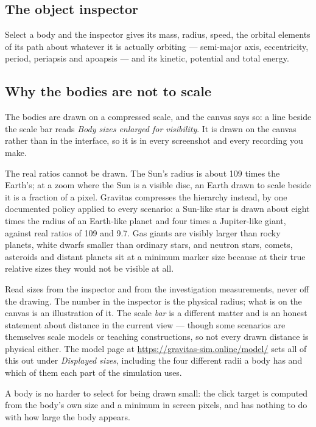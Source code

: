 \documentclass[11pt,a4paper]{article}
\begin{document}
\subsection{The object inspector}

Select a body and the inspector gives its mass, radius, speed, the orbital
elements of its path about whatever it is actually orbiting --- semi-major axis,
eccentricity, period, periapsis and apoapsis --- and its kinetic, potential and
total energy.

\subsection{Why the bodies are not to scale}

The bodies are drawn on a compressed scale, and the canvas says so: a line
beside the scale bar reads \emph{Body sizes enlarged for visibility}. It is
drawn on the canvas rather than in the interface, so it is in every screenshot
and every recording you make.

The real ratios cannot be drawn. The Sun's radius is about 109 times the
Earth's; at a zoom where the Sun is a visible disc, an Earth drawn to scale
beside it is a fraction of a pixel. Gravitas compresses the hierarchy instead,
by one documented policy applied to every scenario: a Sun-like star is drawn
about eight times the radius of an Earth-like planet and four times a
Jupiter-like giant, against real ratios of 109 and 9.7. Gas giants are visibly
larger than rocky planets, white dwarfs smaller than ordinary stars, and
neutron stars, comets, asteroids and distant planets sit at a minimum marker
size because at their true relative sizes they would not be visible at all.

Read sizes from the inspector and from the investigation measurements, never
off the drawing. The number in the inspector is the physical radius; what is on
the canvas is an illustration of it. The scale \emph{bar} is a different
matter and is an honest statement about distance in the current view --- though
some scenarios are themselves scale models or teaching constructions, so not
every drawn distance is physical either. The model page at \url{https://gravitas-sim.online/model/} sets all of this out under
\emph{Displayed sizes}, including the four different radii a body has and
which of them each part of the simulation uses.

A body is no harder to select for being drawn small: the click target is
computed from the body's own size and a minimum in screen pixels, and has
nothing to do with how large the body appears.
\end{document}
